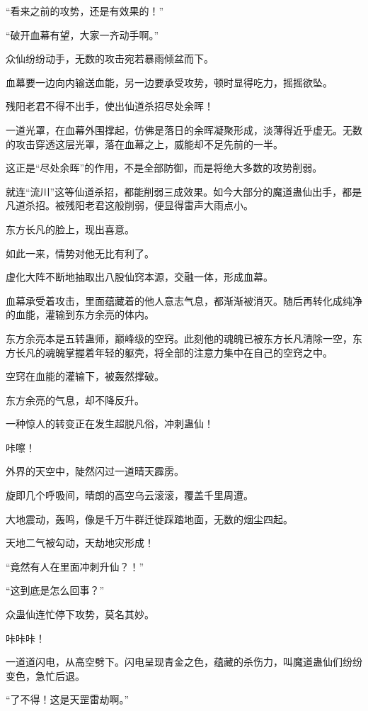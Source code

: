 \begin{this_body}
“看来之前的攻势，还是有效果的！”

“破开血幕有望，大家一齐动手啊。”

众仙纷纷动手，无数的攻击宛若暴雨倾盆而下。

血幕要一边向内输送血能，另一边要承受攻势，顿时显得吃力，摇摇欲坠。

残阳老君不得不出手，使出仙道杀招尽处余晖！

一道光罩，在血幕外围撑起，仿佛是落日的余晖凝聚形成，淡薄得近乎虚无。无数的攻击穿透这层光罩，落在血幕之上，威能却不足先前的一半。

这正是“尽处余晖”的作用，不是全部防御，而是将绝大多数的攻势削弱。

就连“流川”这等仙道杀招，都能削弱三成效果。如今大部分的魔道蛊仙出手，都是凡道杀招。被残阳老君这般削弱，便显得雷声大雨点小。

东方长凡的脸上，现出喜意。

如此一来，情势对他无比有利了。

虚化大阵不断地抽取出八股仙窍本源，交融一体，形成血幕。

血幕承受着攻击，里面蕴藏着的他人意志气息，都渐渐被消灭。随后再转化成纯净的血能，灌输到东方余亮的体内。

东方余亮本是五转蛊师，巅峰级的空窍。此刻他的魂魄已被东方长凡清除一空，东方长凡的魂魄掌握着年轻的躯壳，将全部的注意力集中在自己的空窍之中。

空窍在血能的灌输下，被轰然撑破。

东方余亮的气息，却不降反升。

一种惊人的转变正在发生超脱凡俗，冲刺蛊仙！

咔嚓！

外界的天空中，陡然闪过一道晴天霹雳。

旋即几个呼吸间，晴朗的高空乌云滚滚，覆盖千里周遭。

大地震动，轰鸣，像是千万牛群迁徙踩踏地面，无数的烟尘四起。

天地二气被勾动，天劫地灾形成！

“竟然有人在里面冲刺升仙？！”

“这到底是怎么回事？”

众蛊仙连忙停下攻势，莫名其妙。

咔咔咔！

一道道闪电，从高空劈下。闪电呈现青金之色，蕴藏的杀伤力，叫魔道蛊仙们纷纷变色，急忙后退。

“了不得！这是天罡雷劫啊。”


\end{this_body}
